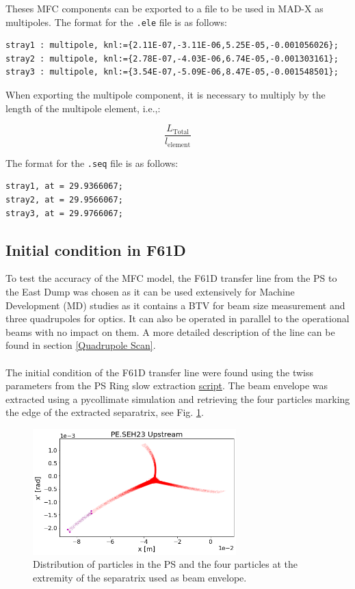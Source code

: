 Theses MFC components can be exported to a file to be used in MAD-X as multipoles. The format for the \texttt{.ele} file is as follows:

\begin{lstlisting}
stray1 : multipole, knl:={2.11E-07,-3.11E-06,5.25E-05,-0.001056026};
stray2 : multipole, knl:={2.78E-07,-4.03E-06,6.74E-05,-0.001303161};
stray3 : multipole, knl:={3.54E-07,-5.09E-06,8.47E-05,-0.001548501};
\end{lstlisting}

When exporting the multipole component, it is necessary to multiply by the length of the multipole element, i.e.,:

\[
\frac{L_{\text{Total}}}{l_{\text{element}}}
\]

The format for the \texttt{.seq} file is as follows:

\begin{lstlisting}
stray1, at = 29.9366067;
stray2, at = 29.9566067;
stray3, at = 29.9766067;
\end{lstlisting}

\subsection{Initial condition in F61D}

To test the accuracy of the MFC model, the F61D transfer line from the PS to the East Dump was chosen as it can be used extensively for Machine Development (MD) studies as it contains a BTV for beam size measurement and three quadrupoles for optics. It can also be operated in parallel to the operational beams with no impact on them. A more detailed description of the line can be found in section \ref{Quadrupole Scan}.
\\
\\
The initial condition of the F61D transfer line were found using the twiss parameters from the PS Ring slow extraction \href{https://gitlab.cern.ch/eljohnso/acc-models-tls-eliott-fork/-/blob/EliottBranch/ps_extraction/east-fast-extraction/Check%20scripts/slow_extraction_trajectory_maptrack_inital_conditions.ipynb}{script}. The beam envelope was extracted using a pycollimate simulation and retrieving the four particles marking the edge of the extracted separatrix, see Fig. \ref{fig:init_pycollimate}.

\begin{figure}[H]
\centering
\includegraphics[width=0.7\textwidth]{02_Simulation/images/init_pycollimate.png}
\caption{Distribution of particles in the PS and the four particles at the extremity of the separatrix used as beam envelope.}
\label{fig:init_pycollimate}
\end{figure}

